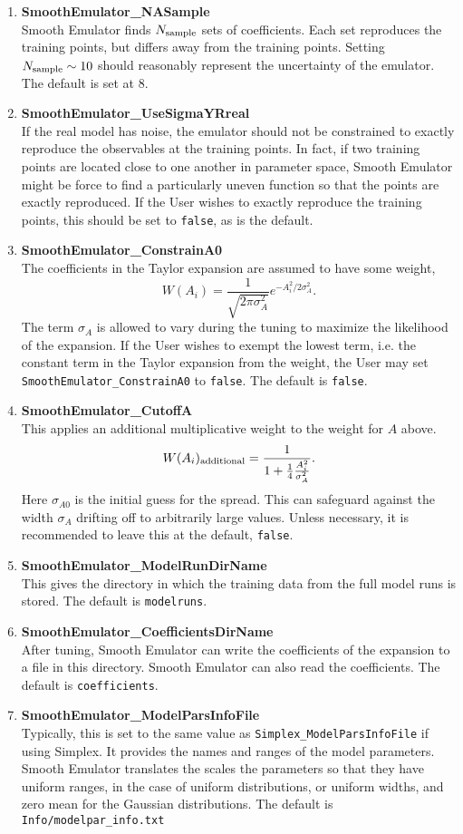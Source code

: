 \documentclass[main.tex]{subfiles}
\begin{document}
\begin{enumerate}
\item {\bf SmoothEmulator\_NASample}\\
Smooth Emulator finds $N_{\rm sample}$ sets of coefficients. Each set reproduces the training points, but differs away from the training points. Setting $N_{\rm sample}\sim 10$ should reasonably represent the uncertainty of the emulator. The default is set at 8.
\item {\bf SmoothEmulator\_UseSigmaYRreal}\\
If the real model has noise, the emulator should not be constrained to exactly reproduce the observables at the training points. In fact, if two training points are located close to one another in parameter space, Smooth Emulator might be force to find a particularly uneven function so that the points are exactly reproduced. If the User wishes to exactly reproduce the training points, this should be set to {\tt false}, as is the  default. 
\item {\bf SmoothEmulator\_ConstrainA0}\\
The coefficients in the Taylor expansion are assumed to have some weight,
\[
W(A_i)=\frac{1}{\sqrt{2\pi\sigma_A^2}}e^{-A_i^2/2\sigma_A^2}.
\]
The term $\sigma_A$ is allowed to vary during the tuning to maximize the likelihood of the expansion. If the User wishes to exempt the lowest term, i.e. the constant term in the Taylor expansion from the weight, the User may set {\tt SmoothEmulator\_ConstrainA0} to {\tt false}. The default is {\tt false}.
\item {\bf SmoothEmulator\_CutoffA}\\
This applies an additional multiplicative weight to the weight for $A$ above.
\[
W(A_i)_{\rm additional}=\frac{1}{1+\frac{1}{4}\frac{A_i^2}{\sigma_{A}^2}}.
\] 
Here $\sigma_{A0}$ is the initial guess for the spread. This can safeguard against the width $\sigma_A$ drifting off to arbitrarily large values. Unless necessary, it is recommended to leave this at the default, {\tt false}.
\item {\bf SmoothEmulator\_ModelRunDirName}\\
This gives the directory in which the training data from the full model runs is stored. The default is {\tt modelruns}.
\item {\bf SmoothEmulator\_CoefficientsDirName}\\
After tuning, Smooth Emulator can write the coefficients of the expansion to a file in this directory. Smooth Emulator can also read the coefficients. The default is {\tt coefficients}.
\item {\bf SmoothEmulator\_ModelParsInfoFile}\\
Typically, this is set to the same value as {\tt Simplex\_ModelParsInfoFile} if using Simplex. It provides the names and ranges of the model parameters. Smooth Emulator translates the scales the parameters so that they have uniform ranges, in the case of uniform distributions, or uniform widths, and zero mean for the Gaussian distributions. The default is {\tt Info/modelpar\_info.txt}


\end{enumerate}
\end{document}
